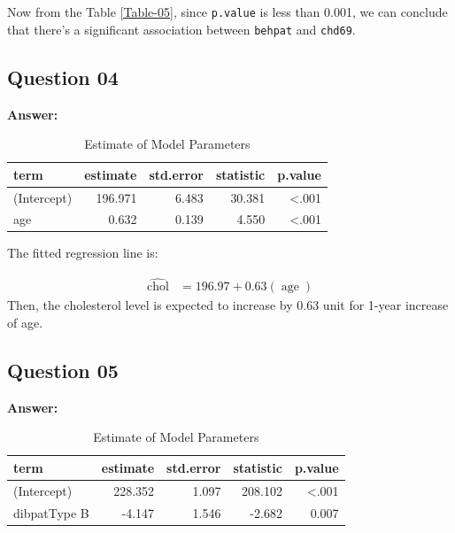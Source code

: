 \documentclass[
  12pt,
  oneside]{article}
\begin{document}
Now from the Table \ref{Table-05}, since \texttt{p.value} is less than 0.001, we can conclude that there's a significant association between \texttt{behpat} and \texttt{chd69}.

\clearpage

\hypertarget{question-04}{%
\subsection{Question 04}\label{question-04}}

\textbf{Answer:}

\begin{table}[H]

\caption{\label{tab:Table-06}Estimate of Model Parameters}
\centering
\begin{tabular}[t]{lrrrr}
\toprule
term & estimate & std.error & statistic & p.value\\
\midrule
(Intercept) & 196.971 & 6.483 & 30.381 & <.001\\
age & 0.632 & 0.139 & 4.550 & <.001\\
\bottomrule
\end{tabular}
\end{table}

The fitted regression line is:

\begin{equation}
\label{eq: eq1}
\begin{aligned}
\operatorname{\widehat{chol}} &= 196.97 + 0.63(\operatorname{age})
\end{aligned}
\end{equation}
Then, the cholesterol level is expected to increase by 0.63 unit
for 1-year increase of age.

\hypertarget{question-05}{%
\subsection{Question 05}\label{question-05}}

\textbf{Answer:}

\begin{table}[H]

\caption{\label{tab:Table-07}Estimate of Model Parameters}
\centering
\begin{tabular}[t]{lrrrr}
\toprule
term & estimate & std.error & statistic & p.value\\
\midrule
(Intercept) & 228.352 & 1.097 & 208.102 & <.001\\
dibpatType B & -4.147 & 1.546 & -2.682 & 0.007\\
\bottomrule
\end{tabular}
\end{table}
\end{document}
